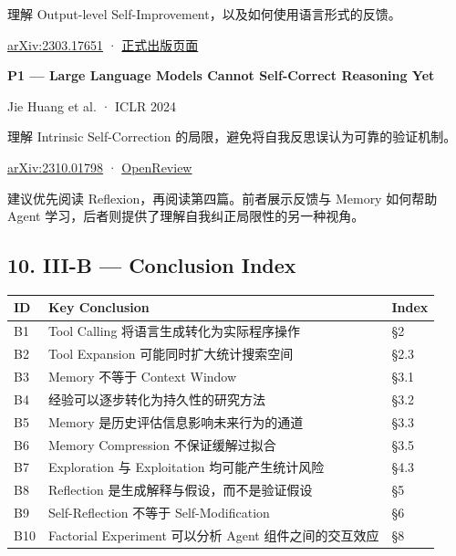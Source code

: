 理解 Output-level Self-Improvement，以及如何使用语言形式的反馈。

\href{https://arxiv.org/abs/2303.17651}{arXiv:2303.17651} · \href{https://proceedings.neurips.cc/paper_files/paper/2023/hash/91edff07232fb1b55a505a9e9f6c0ff3-Abstract-Conference.html}{正式出版页面}

\textbf{P1 --- Large Language Models Cannot Self-Correct Reasoning Yet}

Jie Huang et al. · ICLR 2024

理解 Intrinsic Self-Correction 的局限，避免将自我反思误认为可靠的验证机制。

\href{https://arxiv.org/abs/2310.01798}{arXiv:2310.01798} · \href{https://openreview.net/forum?id=IkmD3fKBPQ}{OpenReview}

建议优先阅读 Reflexion，再阅读第四篇。前者展示反馈与 Memory 如何帮助 Agent 学习，后者则提供了理解自我纠正局限性的另一种视角。

\hypertarget{part-3-34-0001-iii-b-conclusion-index}{%
\subsection{10. III-B --- Conclusion Index}\label{part-3-34-0001-iii-b-conclusion-index}}

\begin{readertable}
\begin{longtable}[]{@{}
  >{\raggedright\arraybackslash}p{}
  >{\raggedright\arraybackslash}p{}
  >{\raggedright\arraybackslash}p{}@{}}
\toprule
ID & Key Conclusion & Index \\
\midrule
\endhead
B1 & Tool Calling 将语言生成转化为实际程序操作 & §2 \\
B2 & Tool Expansion 可能同时扩大统计搜索空间 & §2.3 \\
B3 & Memory 不等于 Context Window & §3.1 \\
B4 & 经验可以逐步转化为持久性的研究方法 & §3.2 \\
B5 & Memory 是历史评估信息影响未来行为的通道 & §3.3 \\
B6 & Memory Compression 不保证缓解过拟合 & §3.5 \\
B7 & Exploration 与 Exploitation 均可能产生统计风险 & §4.3 \\
B8 & Reflection 是生成解释与假设，而不是验证假设 & §5 \\
B9 & Self-Reflection 不等于 Self-Modification & §6 \\
B10 & Factorial Experiment 可以分析 Agent 组件之间的交互效应 & §8 \\
\bottomrule
\end{longtable}
\end{readertable}

